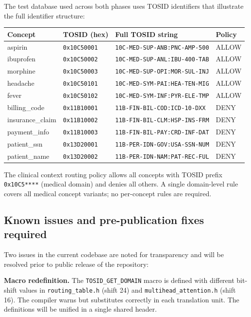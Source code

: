 \documentclass[11pt,a4paper]{article}
\theoremstyle{definition}
\begin{document}
The test database used across both phases uses TOSID identifiers that
illustrate the full identifier structure:

\begin{center}
\small
\begin{tabular}{@{}llll@{}}
\toprule
Concept & TOSID (hex) & Full TOSID string & Policy \\
\midrule
aspirin         & \texttt{0x10C50001} & \texttt{10C-MED-SUP-ANB:PNC-AMP-500} & ALLOW \\
ibuprofen       & \texttt{0x10C50002} & \texttt{10C-MED-SUP-ANL:IBU-400-TAB} & ALLOW \\
morphine        & \texttt{0x10C50003} & \texttt{10C-MED-SUP-OPI:MOR-SUL-INJ} & ALLOW \\
headache        & \texttt{0x10C50101} & \texttt{10C-MED-SYM-PAI:HEA-TEN-MIG} & ALLOW \\
fever           & \texttt{0x10C50102} & \texttt{10C-MED-SYM-INF:PYR-ELE-TMP} & ALLOW \\
\midrule
billing\_code   & \texttt{0x11B10001} & \texttt{11B-FIN-BIL-COD:ICD-10-DXX} & DENY \\
insurance\_claim& \texttt{0x11B10002} & \texttt{11B-FIN-BIL-CLM:HSP-INS-FRM} & DENY \\
payment\_info   & \texttt{0x11B10003} & \texttt{11B-FIN-BIL-PAY:CRD-INF-DAT} & DENY \\
\midrule
patient\_ssn    & \texttt{0x13D20001} & \texttt{11B-PER-IDN-GOV:USA-SSN-NUM} & DENY \\
patient\_name   & \texttt{0x13D20002} & \texttt{11B-PER-IDN-NAM:PAT-REC-FUL} & DENY \\
\bottomrule
\end{tabular}
\end{center}

The clinical context routing policy allows all concepts with TOSID prefix
\texttt{0x10C5****} (medical domain) and denies all others. A single
domain-level rule covers all medical concept variants; no per-concept rules
are required.

\subsection{Known issues and pre-publication fixes required}
\label{sec:knownissues}

Two issues in the current codebase are noted for transparency and will be
resolved prior to public release of the repository:

\textbf{Macro redefinition.} The \texttt{TOSID\_GET\_DOMAIN} macro is defined
with different bit-shift values in \texttt{routing\_table.h} (shift 24) and
\texttt{multihead\_attention.h} (shift 16). The compiler warns but substitutes
correctly in each translation unit. The definitions will be unified in a
single shared header.
\end{document}
